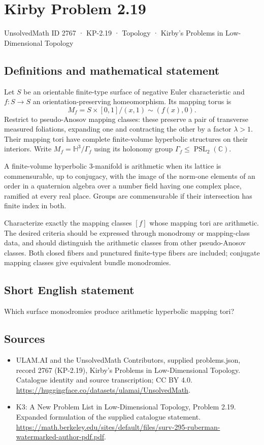 \documentclass[11pt,a4paper]{article}
\begin{document}
\section*{Kirby Problem 2.19}\label{2767}
{\small UnsolvedMath ID 2767 · KP-2.19 · Topology · Kirby's Problems in Low-Dimensional Topology}
\subsection{Definitions and mathematical statement}
Let $S$ be an orientable finite-type surface of negative Euler characteristic
and $f:S\to S$ an orientation-preserving homeomorphism. Its mapping torus is
\[
M_f=S\times[0,1]/(x,1)\sim(f(x),0).
\]
Restrict to pseudo-Anosov mapping classes: these preserve a pair of transverse
measured foliations, expanding one and contracting the other by a factor
$\lambda>1$. Their mapping tori have complete finite-volume hyperbolic
structures on their interiors. Write $M_f=\mathbb H^3/\Gamma_f$ using its
holonomy group $\Gamma_f\leq\operatorname{PSL}_2(\mathbb C)$.

A finite-volume hyperbolic $3$-manifold is arithmetic when its lattice is
commensurable, up to conjugacy, with the image of the norm-one elements of an
order in a quaternion algebra over a number field having one complex place,
ramified at every real place. Groups are commensurable if their intersection
has finite index in both.

Characterize exactly the mapping classes $[f]$ whose mapping tori are
arithmetic. The desired criteria should be expressed through monodromy or
mapping-class data, and should distinguish the arithmetic classes from other
pseudo-Anosov classes. Both closed fibers and punctured finite-type fibers
are included; conjugate mapping classes give equivalent bundle monodromies.
\subsection{Short English statement}
Which surface monodromies produce arithmetic hyperbolic mapping tori?
\subsection{Sources}
\begin{itemize}
\item[S1] ULAM.AI and the UnsolvedMath Contributors, supplied problems.json, record 2767 (KP-2.19), Kirby's Problems in Low-Dimensional Topology. Catalogue identity and source transcription; CC BY 4.0.
\url{https://huggingface.co/datasets/ulamai/UnsolvedMath}.
\item[S2] K3: A New Problem List in Low-Dimensional Topology, Problem 2.19. Expanded formulation of the supplied catalogue statement.
\url{https://math.berkeley.edu/sites/default/files/surv-295-ruberman-watermarked-author-pdf.pdf}.
\end{itemize}
\end{document}
